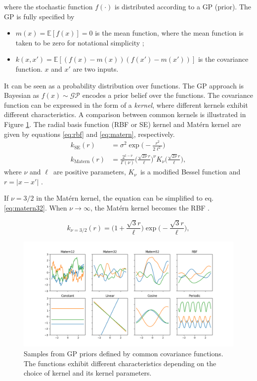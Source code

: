 where the stochastic function $f(\cdot)$ is distributed according to a GP (prior).
The GP is fully specified by
\begin{itemize}
    \item $m(x) = \mathbb{E}[f(x)] = 0$ is the mean function, where the mean function is taken to be zero for notational simplicity \cite{Rasmussen2006};
    \item $k(x, x') = \mathbb{E}[(f(x) - m(x))(f(x') - m(x'))]$ is the covariance function.
    $x$ and $x'$ are two inputs.
\end{itemize}
It can be seen as a probability distribution over functions.
The GP approach is Bayesian as \(f(x) \sim \mathcal{GP}\) encodes a prior belief over the functions.
The covariance function can be expressed in the form of a \textit{kernel}, where different kernels exhibit different characteristics.
A comparison between common kernels is illustrated in Figure \ref{fig:gp-kernels}.
The radial basis function (RBF or SE) kernel and Matérn kernel are given by equations \ref{eq:rbf} and \ref{eq:matern}, respectively.
\begin{align}
k_{\textrm{SE}}(r) &= \sigma^2 \exp{\Big(-\frac{r^2}{2\ell^2}\Big)} \label{eq:rbf} \\
k_{\textrm{Matern}}(r) &= \frac{2^{1-\nu}}{\Gamma(\nu)} \Big(\frac{\sqrt{2\nu}r}{\ell}\Big)^\nu K_\nu\Big(\frac{\sqrt{2\nu}r}{\ell}\Big), \label{eq:matern}
\end{align}
where $\nu$ and $\ell$ are positive parameters, $K_\nu$ is a modified Bessel function and $r = |x-x'|$ \cite{Rasmussen2006}.

If $\nu = 3/2$ in the Matérn kernel, the equation can be simplified to eq. \ref{eq:matern32}.
When $\nu \rightarrow \infty$, the Matérn kernel becomes the RBF \cite{Rasmussen2006}.

\begin{equation} \label{eq:matern32}
    k_{\nu=3/2}(r) = \Big(1+\frac{\sqrt{3}r}{\ell}\Big)\exp{\Big(-\frac{\sqrt{3}r}{\ell}\Big)},
\end{equation}

\begin{figure} [t!]
    \centering
    \includegraphics[width=\textwidth]{figures/gp_kernels}
    \caption[Samples from GP priors defined by common covariance functions]
    {\small Samples from GP priors defined by common covariance functions. 
    The functions exhibit different characteristics depending on the choice of kernel and its kernel parameters.}
    \label{fig:gp-kernels}
\end{figure}

